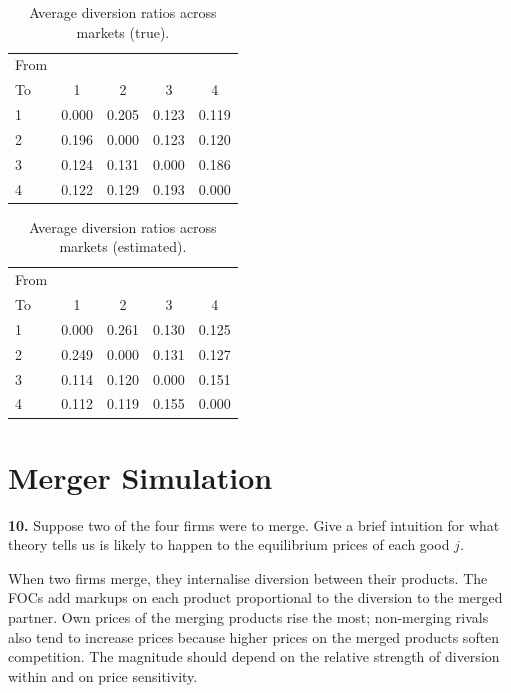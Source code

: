 \documentclass{article}
\begin{document}
\begin{table}[H]\centering
\caption{Average diversion ratios across markets (true).}
\begin{tabular}{lcccc}\hline From\\To & 1 & 2 & 3 & 4\\\hline
1 & 0.000 & 0.205 & 0.123 & 0.119\\
2 & 0.196 & 0.000 & 0.123 & 0.120\\
3 & 0.124 & 0.131 & 0.000 & 0.186\\
4 & 0.122 & 0.129 & 0.193 & 0.000\\
\hline\end{tabular}\end{table}

\begin{table}[H]\centering
\caption{Average diversion ratios across markets (estimated).}
\begin{tabular}{lcccc}\hline From\\To & 1 & 2 & 3 & 4\\\hline
1 & 0.000 & 0.261 & 0.130 & 0.125\\
2 & 0.249 & 0.000 & 0.131 & 0.127\\
3 & 0.114 & 0.120 & 0.000 & 0.151\\
4 & 0.112 & 0.119 & 0.155 & 0.000\\
\hline\end{tabular}\end{table}


\section*{Merger Simulation}

\begin{tcolorbox}
\textbf{10.} Suppose two of the four firms were to merge. Give a brief
intuition for what theory tells us is likely to happen to the equilibrium
prices of each good $j$.
\end{tcolorbox}

When two firms merge, they internalise diversion between their products. The FOCs add markups on each product proportional to the diversion to the merged partner. Own prices of the merging products rise the most; non-merging rivals also tend to increase prices because higher prices on the merged products soften competition. The magnitude should depend on the relative strength of diversion within and on price sensitivity.
\end{document}
